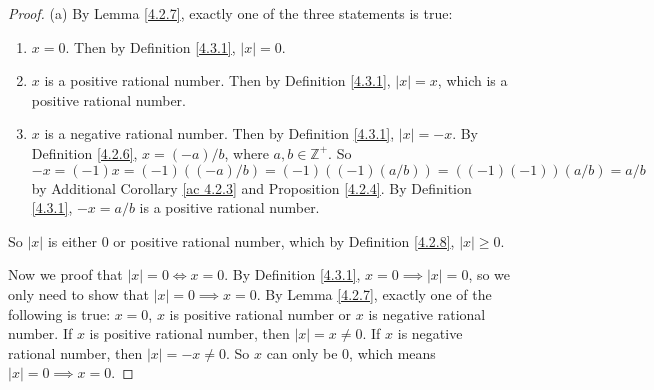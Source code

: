 \begin{proof}{(a)}
By Lemma \ref{4.2.7}, exactly one of the three statements is true:
\begin{enumerate}[label=(\roman*)]
    \item \(x = 0\).
    Then by Definition \ref{4.3.1}, \(|x| = 0\).
    \item \(x\) is a positive rational number.
    Then by Definition \ref{4.3.1}, \(|x| = x\), which is a positive rational number.
    \item \(x\) is a negative rational number.
    Then by Definition \ref{4.3.1}, \(|x| = -x\).
    By Definition \ref{4.2.6}, \(x = (-a) / b\), where \(a, b \in \mathds{Z}^+\).
    So \(-x = (-1)x = (-1)((-a) / b) = (-1)((-1)(a / b)) = ((-1)(-1))(a / b) = a / b\) by Additional Corollary \ref{ac 4.2.3} and Proposition \ref{4.2.4}.
    By Definition \ref{4.3.1}, \(-x = a / b\) is a positive rational number.
\end{enumerate}
So \(|x|\) is either \(0\) or positive rational number, which by Definition \ref{4.2.8}, \(|x| \geq 0\).

Now we proof that \(|x| = 0 \iff x = 0\).
By Definition \ref{4.3.1}, \(x = 0 \implies |x| = 0\), so we only need to show that \(|x| = 0 \implies x = 0\).
By Lemma \ref{4.2.7}, exactly one of the following is true:
\(x = 0\), \(x\) is positive rational number or \(x\) is negative rational number.
If \(x\) is positive rational number, then \(|x| = x \neq 0\).
If \(x\) is negative rational number, then \(|x| = -x \neq 0\).
So \(x\) can only be \(0\), which means \(|x| = 0 \implies x = 0\).
\end{proof}

